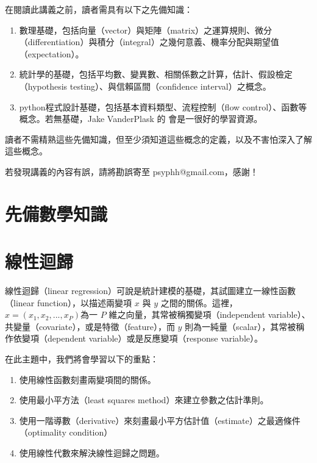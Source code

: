 \documentclass[letterpaper,10pt,english]{sphinxmanual}
\begin{document}
在閱讀此講義之前，讀者需具有以下之先備知識：
\begin{enumerate}
%
\item {} 
數理基礎，包括向量（vector）與矩陣（matrix）之運算規則、微分（differentiation）與積分（integral）之幾何意義、機率分配與期望值（expectation）。

\item {} 
統計學的基礎，包括平均數、變異數、相關係數之計算，估計、假設檢定（hypothesis testing）、與信賴區間（confidence interval）之概念。

\item {} 
python程式設計基礎，包括基本資料類型、流程控制（flow control）、函數等概念。若無基礎，Jake VanderPlask 的  會是一很好的學習資源。

\end{enumerate}

讀者不需精熟這些先備知識，但至少須知道這些概念的定義，以及不害怕深入了解這些概念。

若發現講義的內容有誤，請將勘誤寄至 psyphh@gmail.com，感謝！


\chapter{先備數學知識}
\label{\detokenize{notebook/mathematics-prerequisite:id1}}\label{\detokenize{notebook/mathematics-prerequisite::doc}}

\chapter{線性迴歸}
\label{\detokenize{notebook/linear-regression:id1}}\label{\detokenize{notebook/linear-regression::doc}}
線性迴歸（linear regression）可說是統計建模的基礎，其試圖建立一線性函數（linear function），以描述兩變項 \(x\) 與 \(y\) 之間的關係。這裡，\(x=(x_1,x_2,..., x_P)\)為一 \(P\) 維之向量，其常被稱獨變項（independent variable）、共變量（covariate），或是特徵（feature），而 \(y\) 則為一純量（scalar），其常被稱作依變項（dependent variable）或是反應變項（response variable）。

在此主題中，我們將會學習以下的重點：
\begin{enumerate}
%
\item {} 
使用線性函數刻畫兩變項間的關係。

\item {} 
使用最小平方法（least squares method）來建立參數之估計準則。

\item {} 
使用一階導數（derivative）來刻畫最小平方估計值（estimate）之最適條件（optimality condition）

\item {} 
使用線性代數來解決線性迴歸之問題。

\end{enumerate}
\end{document}
